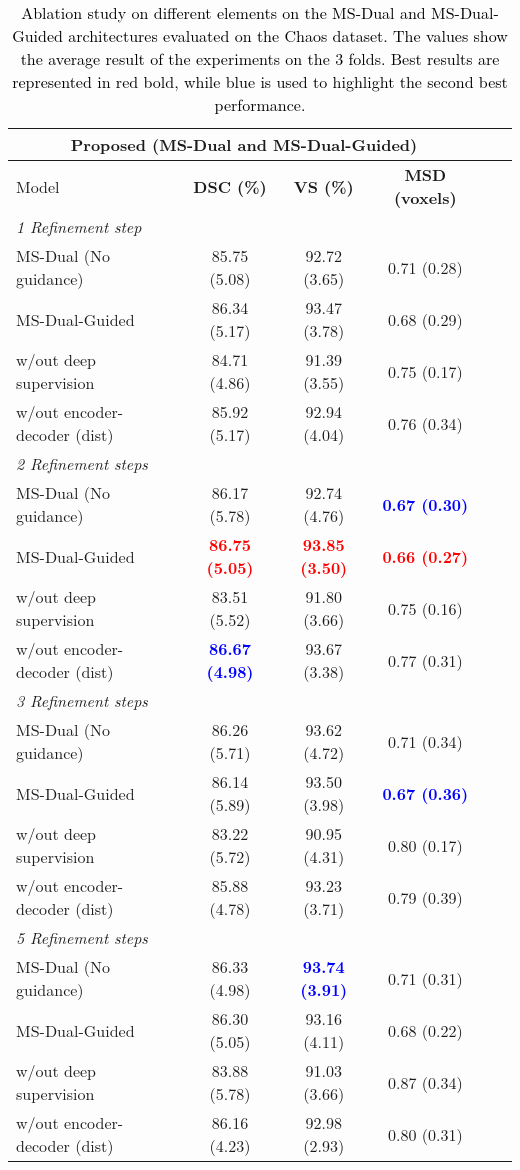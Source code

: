 \documentclass[journal]{IEEEtran}
\begin{document}
\begin{table}[ht!]
\centering
\scriptsize
\begin{tabular}{lcccc|c}\\
\toprule
\multicolumn{4}{c}{Proposed (MS-Dual and MS-Dual-Guided)} \\
\midrule
Model & \textbf{DSC (\%)} & \textbf{VS (\%)} & \textbf{MSD (voxels)}  \\
\midrule
\multicolumn{4}{l}{\textit{1 Refinement step}} \\
MS-Dual (No guidance)  & 85.75 (5.08)& 92.72 (3.65) & 0.71 (0.28)\\
MS-Dual-Guided   & 86.34 (5.17) & 93.47 (3.78) & 0.68 (0.29) \\
w/out deep supervision    & 84.71 (4.86)  & 91.39 (3.55) & 0.75 (0.17) \\
w/out encoder-decoder (dist) &  85.92 (5.17)  & 92.94 (4.04) & 0.76 (0.34)\\

\midrule
\multicolumn{4}{l}{\textit{2 Refinement steps}} \\
MS-Dual (No guidance)   & 86.17 (5.78) & 92.74 (4.76) &  \textcolor{blue}{\textbf{0.67 (0.30)}}\\
MS-Dual-Guided   &  \textcolor{red}{\textbf{86.75 (5.05)}} & \textcolor{red}{\textbf{93.85 (3.50)}} &  \textcolor{red}{\textbf{0.66 (0.27)}}\\
w/out deep supervision   & 83.51 (5.52) &  91.80 (3.66)& 0.75 (0.16)\\
w/out encoder-decoder (dist)   &  \textcolor{blue}{\textbf{86.67 (4.98)}}  & 93.67 (3.38) & 0.77 (0.31) \\

\midrule
\multicolumn{4}{l}{\textit{3 Refinement steps}} \\
MS-Dual (No guidance)  &  86.26 (5.71) & 93.62 (4.72) & 0.71 (0.34)\\
MS-Dual-Guided   & 86.14 (5.89)  & 93.50 (3.98)& \textcolor{blue}{\textbf{0.67 (0.36)}} \\
w/out deep supervision   & 83.22 (5.72)& 90.95 (4.31)& 0.80 (0.17)\\
w/out encoder-decoder (dist)  &  85.88 (4.78) & 93.23 (3.71) &  0.79 (0.39)\\
\midrule
\multicolumn{4}{l}{\textit{5 Refinement steps}} \\
MS-Dual (No guidance)  & 86.33 (4.98)  &  \textcolor{blue}{\textbf{93.74 (3.91)}} & 0.71 (0.31)\\
MS-Dual-Guided   & 86.30 (5.05)  & 93.16 (4.11)& 0.68 (0.22) \\
w/out deep supervision   & 83.88 (5.78) & 91.03 (3.66) & 0.87 (0.34)\\
w/out encoder-decoder (dist)  & 86.16 (4.23) &  92.98 (2.93) & 0.80 (0.31) \\
\midrule
\end{tabular}
\caption{\textcolor{black}{Ablation study on different elements on the MS-Dual and MS-Dual-Guided architectures evaluated on the Chaos dataset. The values show the average result of the experiments on the 3 folds. Best results are represented in red bold, while blue is used to highlight the second best performance.}}
\label{table:metrics_ablation2}
\end{table}
\end{document}
